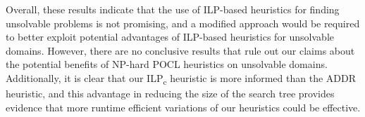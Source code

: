 Overall, these results indicate that the use of ILP-based heuristics for finding unsolvable problems is not promising, and a modified approach would be required to better exploit potential advantages of ILP-based heuristics for unsolvable domains. However, there are no conclusive results that rule out our claims about the potential benefits of NP-hard POCL heuristics on unsolvable domains. Additionally, it is clear that our ILP\textsubscript{c} heuristic is more informed than the ADDR heuristic, and this advantage in reducing the size of the search tree provides evidence that more runtime efficient variations of our heuristics could be effective.